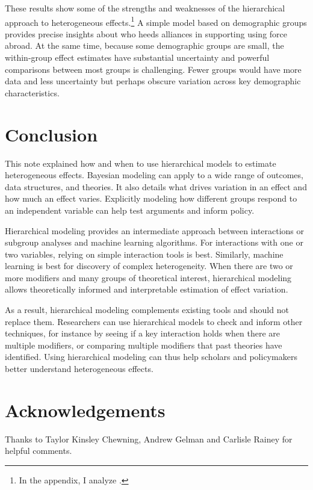 \documentclass[12pt]{article}
\begin{document}
These results show some of the strengths and weaknesses of the hierarchical approach to heterogeneous effects.\footnote{In the appendix, I analyze \citet{BushPrather2020}.}
A simple model based on demographic groups provides precise insights about who heeds alliances in supporting using force abroad. 
At the same time, because some demographic groups are small, the within-group effect estimates have substantial uncertainty and powerful comparisons between most groups is challenging. 
Fewer groups would have more data and less uncertainty but perhaps obscure variation across key demographic characteristics. 


\section{Conclusion}


This note explained how and when to use hierarchical models to estimate heterogeneous effects. 
Bayesian modeling can apply to a wide range of outcomes, data structures, and theories. 
It also details what drives variation in an effect and how much an effect varies. 
Explicitly modeling how different groups respond to an independent variable can help test arguments and inform policy.  


Hierarchical modeling provides an intermediate approach between interactions or subgroup analyses and machine learning algorithms. 
For interactions with one or two variables, relying on simple interaction tools is best. 
Similarly, machine learning is best for discovery of complex heterogeneity.
When there are two or more modifiers and many groups of theoretical interest, hierarchical modeling allows theoretically informed and interpretable estimation of effect variation. 

As a result, hierarchical modeling complements existing tools and should not replace them. 
Researchers can use hierarchical models to check and inform other techniques, for instance by seeing if a key interaction holds when there are multiple modifiers, or comparing multiple modifiers that past theories have identified. 
Using hierarchical modeling can thus help scholars and policymakers better understand heterogeneous effects.


\section*{Acknowledgements}

Thanks to Taylor Kinsley Chewning, Andrew Gelman and Carlisle Rainey for helpful comments.

\singlespace
 


%
\end{document}
